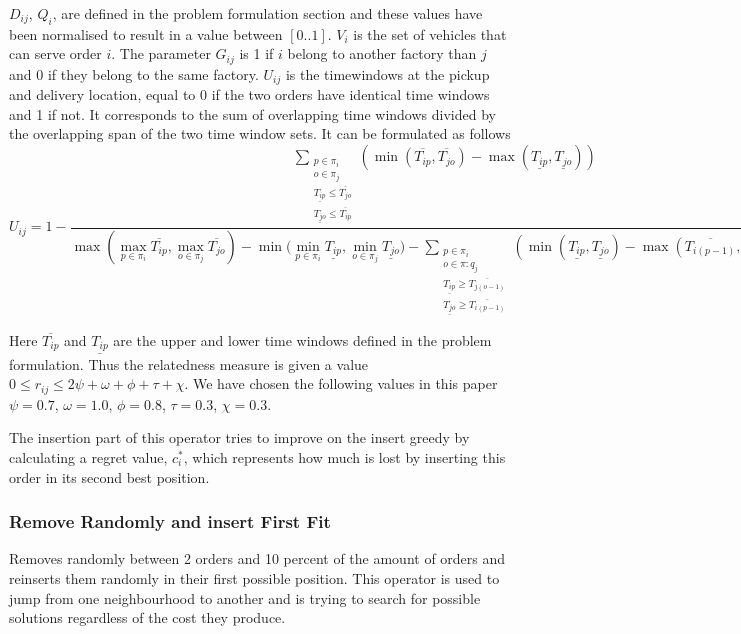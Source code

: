 \documentclass[a4paper,10pt]{article}
\begin{document}
$D_{ij}$, $Q_i$, are defined in the problem formulation section and these values have been normalised to result in a value between $[0..1]$. 
$V_i$ is the set of vehicles that can serve order $i$. 
The parameter $G_{ij}$ is 1 if $i$ belong to another factory than $j$ and 0 if they belong to the same factory. 
$U_{ij}$ is the timewindows at the pickup and delivery location, equal to 0 if the two orders have identical time windows and 1 if not. It corresponds to the sum of overlapping time windows divided by the overlapping span of the two time window sets.
It can be formulated as follows
\begin{equation}
    \label{overlaptime}
    U_{ij} = 1 - 
\dfrac{ 
    \sum\limits_{\substack{p\in \pi_i\\ o\in \pi_j\\ \underline{T_{ip}}\leq \overline{T_{jo}}\\ \underline{T_{jo}}\leq\overline{T_{ip}}}} 
    (\min(\overline{T_{ip}}, \overline{T_{jo}}) - \max(\underline{T_{ip}},\underline{T_{jo}}) )
    }
    {\max{(\max\limits_{p\in \pi_i} \overline{T_{ip}}, \max\limits_{o\in \pi_j} \overline{T_{jo}})} - 
    \min{(\min\limits_{p\in \pi_i} \underline{T_{ip}}, \min\limits_{o\in \pi_j} \underline{T_{jo}}}) -     
    \sum\limits_{\substack{p\in \pi_i\\ o\in \pi:q_j\\ \underline{T_{ip}}\geq \overline{T_{j(o-1)}}\\ \underline{T_{jo}}\geq\overline{T_{i(p-1)}}}} 
    (\min(\underline{T_{ip}}, \underline{T_{jo}}) - \max(\overline{T_{i(p-1)}},\overline{T_{j(o-1)}}) ) 
    }
\end{equation}

Here $\overline{T_{ip}}$ and $\underline{T_{ip}}$ are the upper and lower time windows defined in the problem formulation.
Thus the relatedness measure is given a value $0\leq r_{ij} \leq 2\psi + \omega + \phi + \tau  + \chi$. 
We have chosen the following values in this paper $\psi=0.7$, $\omega=1.0$, $\phi=0.8$, $\tau=0.3$, $\chi = 0.3$. \newline\par
The insertion part of this operator tries to improve on the insert greedy by calculating a regret value, $c^*_i$, which represents how much is lost by inserting this order in its second best position.

\subsubsection{Remove Randomly and insert First Fit}
Removes randomly between 2 orders and 10 percent of the amount of orders and reinserts them randomly in their first possible position. 
This operator is used to jump from one neighbourhood to another and is trying to search for possible solutions regardless of the cost they produce.




\end{document}
